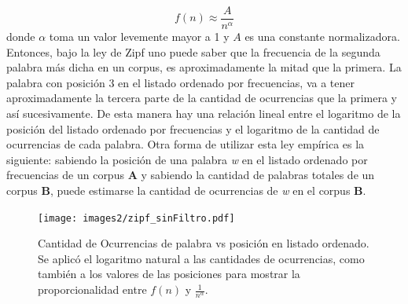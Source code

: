 $$f(n) \approx \frac{A}{n^{\alpha}}$$
donde $\alpha$ toma un valor levemente mayor a 1 y $A$ es una constante normalizadora.
Entonces, bajo la ley de Zipf uno puede saber que la frecuencia de la segunda palabra más dicha en un corpus, es aproximadamente la mitad que la primera. La palabra con posición 3 en el listado ordenado por frecuencias, va a tener aproximadamente la tercera parte de la cantidad de ocurrencias que la primera y así sucesivamente. De esta manera hay una relación lineal entre el logaritmo de la posición del listado ordenado por frecuencias y el logaritmo de la cantidad de ocurrencias de cada palabra.
Otra forma de utilizar esta ley empírica es la siguiente:
sabiendo la posición de una palabra \textit{w} en el listado ordenado por frecuencias de un corpus \textbf{A} y sabiendo la cantidad de palabras totales de un corpus \textbf{B}, puede estimarse la cantidad de ocurrencias de \textit{w} en el corpus \textbf{B}.

\begin{figure}[!ht]
\centering
\texttt{[image: images2/zipf\_sinFiltro.pdf]}
\caption{Cantidad de Ocurrencias de palabra vs posición en listado ordenado. Se aplicó el logaritmo natural a las cantidades de ocurrencias, como también a los valores de las posiciones para mostrar la proporcionalidad entre $f(n)$ y $\frac{1}{n^{\alpha}}$.} 
\label{fig:zipf} 
\end{figure}











